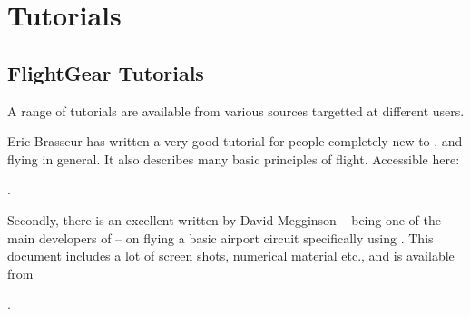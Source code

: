 
\chapter{Tutorials\label{tutorials}}

\section{FlightGear Tutorials}

A range of \FlightGear{} tutorials are available from various sources targetted at different users. 

Eric Brasseur has written a very good tutorial for people completely new to \FlightGear{}, and flying in general. It also describes many basic principles of flight. Accessible here: 

\medskip
{}.
\medskip

Secondly, there is an excellent  written by David
Megginson  -- being one of the main developers
of \FlightGear{} -- on flying a basic airport circuit specifically
using \FlightGear{}. This document includes a lot of screen shots,
numerical material etc., and is available from

\medskip
{}.
\medskip

